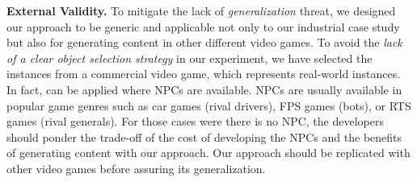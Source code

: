 \textbf{External Validity.}
To mitigate the lack of \textit{generalization} threat, we designed our approach to be generic and applicable not only to our industrial case study but also for generating content in other different video games. 
To avoid the \textit{lack of a clear object selection strategy} in our experiment, we have selected the instances from a commercial video game, which represents real-world instances.
In fact, \ApproachName{} can be applied where NPCs are available. NPCs are usually available in popular game genres such as car games (rival drivers), FPS games (bots), or RTS games (rival generals). For those cases were there is no NPC, the developers should ponder the trade-off of the cost of developing the NPCs and the benefits of generating content with our approach. Our approach should be replicated with other video games before assuring its generalization.


